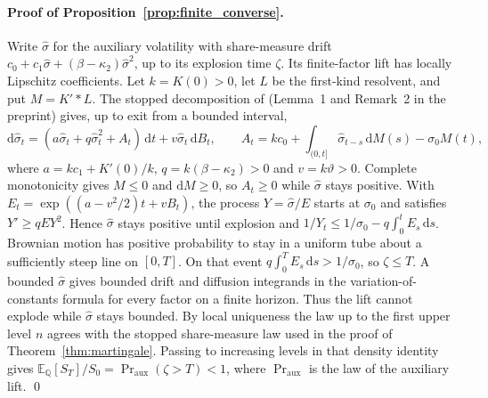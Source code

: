 \documentclass[11pt,a4paper]{article}
\theoremstyle{definition}
\newcommand{\D}{\mathrm{d}}
\newcommand{\E}{\mathbb{E}}
\newcommand{\Q}{\mathbb{Q}}
\begin{document}
\paragraph{Proof of Proposition~\ref{prop:finite_converse}.} Write $\widehat\sigma$ for the auxiliary volatility with share-measure drift $c_0+c_1\widehat\sigma+(\beta-\kappa_2)\widehat\sigma^2$, up to its explosion time $\zeta$. Its finite-factor lift has locally Lipschitz coefficients. Let $k=K(0)>0$, let $L$ be the first-kind resolvent, and put $M=K'*L$. The stopped decomposition of \citet{BondiPulido2026} (Lemma~1 and Remark~2 in the preprint) gives, up to exit from a bounded interval,
\[
\D\widehat\sigma_t=(a\widehat\sigma_t+q\widehat\sigma_t^2+A_t)\,\D t+v\widehat\sigma_t\,\D B_t,\qquad
A_t=kc_0+\int_{(0,t]}\widehat\sigma_{t-s}\,\D M(s)-\sigma_0M(t),
\]
where $a=kc_1+K'(0)/k$, $q=k(\beta-\kappa_2)>0$ and $v=k\vartheta>0$. Complete monotonicity gives $M\le0$ and $\D M\ge0$, so $A_t\ge0$ while $\widehat\sigma$ stays positive. With $E_t=\exp((a-v^2/2)t+vB_t)$, the process $Y=\widehat\sigma/E$ starts at $\sigma_0$ and satisfies $Y'\ge qE Y^2$. Hence $\widehat\sigma$ stays positive until explosion and $1/Y_t\le1/\sigma_0-q\int_0^tE_s\,\D s$. Brownian motion has positive probability to stay in a uniform tube about a sufficiently steep line on $[0,T]$. On that event $q\int_0^T E_s\,\D s>1/\sigma_0$, so $\zeta\le T$. A bounded $\widehat\sigma$ gives bounded drift and diffusion integrands in the variation-of-constants formula for every factor on a finite horizon. Thus the lift cannot explode while $\widehat\sigma$ stays bounded. By local uniqueness the law up to the first upper level $n$ agrees with the stopped share-measure law used in the proof of Theorem~\ref{thm:martingale}. Passing to increasing levels in that density identity gives $\E_\Q[S_T]/S_0=\Pr_{\mathrm{aux}}(\zeta>T)<1$, where $\Pr_{\mathrm{aux}}$ is the law of the auxiliary lift. \qed
\end{document}
